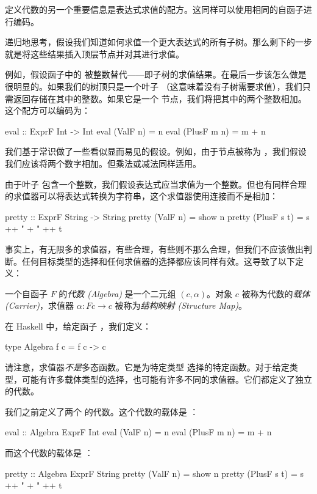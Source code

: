 \documentclass[DaoFP]{subfiles}
\begin{document}
 定义代数的另一个重要信息是表达式求值的配方。这同样可以使用相同的自函子进行编码。

 递归地思考，假设我们知道如何求值一个更大表达式的所有子树。那么剩下的一步就是将这些结果插入顶层节点并对其进行求值。

 例如，假设函子中的  被整数替代——即子树的求值结果。在最后一步该怎么做是很明显的。如果我们的树顶只是一个叶子 （这意味着没有子树需要求值），我们只需返回存储在其中的整数。如果它是一个  节点，我们将把其中的两个整数相加。这个配方可以编码为：
 \begin{haskell}
  eval :: ExprF Int -> Int
  eval (ValF n)    = n
  eval (PlusF m n) = m + n
 \end{haskell}

 我们基于常识做了一些看似显而易见的假设。例如，由于节点被称为 ，我们假设我们应该将两个数字相加。但乘法或减法同样适用。

 由于叶子  包含一个整数，我们假设表达式应当求值为一个整数。但也有同样合理的求值器可以将表达式转换为字符串，这个求值器使用连接而不是相加：
 \begin{haskell}
  pretty :: ExprF String -> String
  pretty (ValF n)    = show n
  pretty (PlusF s t) = s ++ " + " ++ t
 \end{haskell}

 事实上，有无限多的求值器，有些合理，有些则不那么合理，但我们不应该做出判断。任何目标类型的选择和任何求值器的选择都应该同样有效。这导致了以下定义：

 一个自函子 $F$ 的\emph{代数 (Algebra)} 是一个二元组 $(c, \alpha)$。对象 $c$ 被称为代数的\emph{载体 (Carrier)}，求值器 $\alpha \colon F c \to c$ 被称为\emph{结构映射 (Structure Map)}。

 在 Haskell 中，给定函子 ，我们定义：
 \begin{haskell}
  type Algebra f c = f c -> c
 \end{haskell}

 请注意，求值器\emph{不是}多态函数。它是为特定类型  选择的特定函数。对于给定类型，可能有许多载体类型的选择，也可能有许多不同的求值器。它们都定义了独立的代数。

 我们之前定义了两个  的代数。这个代数的载体是 ：
 \begin{haskell}
  eval :: Algebra ExprF Int
  eval (ValF n)   = n
  eval (PlusF m n) = m + n
 \end{haskell}
 而这个代数的载体是 ：
 \begin{haskell}
  pretty :: Algebra ExprF String
  pretty (ValF n)   = show n
  pretty (PlusF s t) = s ++ " + " ++ t
 \end{haskell}
\end{document}
